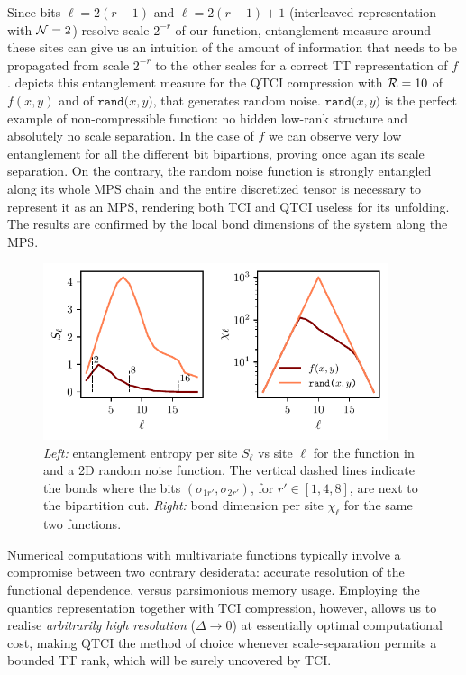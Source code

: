 \begin{example}
Since bits $\ell = 2(r-1)$ and $\ell = 2(r-1) + 1$ (interleaved representation with  $\mathcal{N} = 2$) resolve scale $2^{-r}$ of our function, entanglement measure around these sites can give us an intuition of the amount of information that needs to be propagated from scale $2^{-r}$ to the other scales for a correct TT representation of $f$.  depicts this entanglement measure for the QTCI compression with $\mathcal{R} = 10$ of $f(x,y)$ and of $\texttt{rand(}x,y\texttt{)}$, that generates random noise. $\texttt{rand(}x,y\texttt{)}$ is the perfect example of non-compressible function: no hidden low-rank structure and absolutely no scale separation. In the case of $f$ we can observe very low entanglement for all the different bit bipartions, proving once agan its scale separation. On the contrary, the random noise function is strongly entangled along its whole MPS chain and the entire discretized tensor is necessary to represent it as an MPS, rendering both TCI and QTCI useless for its unfolding. The results are confirmed by the local bond dimensions of the system along the MPS.
	
	\begin{figure}[ht!]
		\centering
		\includegraphics[width=0.9\textwidth]{figures/QTCI_ent_entropy+bonddims.pdf}
		\caption{ \textit{Left:} entanglement entropy per site $S_\ell$ vs site $\ell$ for the function in  and a 2D random noise function. The vertical dashed lines indicate the bonds where the bits $(\sigma_{1r'}, \sigma_{2r'})$, for $r' \in [1,4,8]$, are next to the bipartition cut. \textit{Right:} bond dimension per site $\chi_\ell$ for the same two functions.}
		\label{fig:QTCIEntanglement}
	\end{figure}
\end{example}


Numerical computations with multivariate functions typically involve a compromise between two contrary desiderata: accurate resolution of the functional dependence, versus parsimonious memory usage. Employing the quantics representation together with TCI compression, however, allows us to realise \emph{arbitrarily high resolution}
(\(\Delta\!\to\!0\)) at essentially optimal computational cost, making QTCI the
method of choice whenever scale‑separation permits a bounded TT rank, which will be surely uncovered by TCI. 

